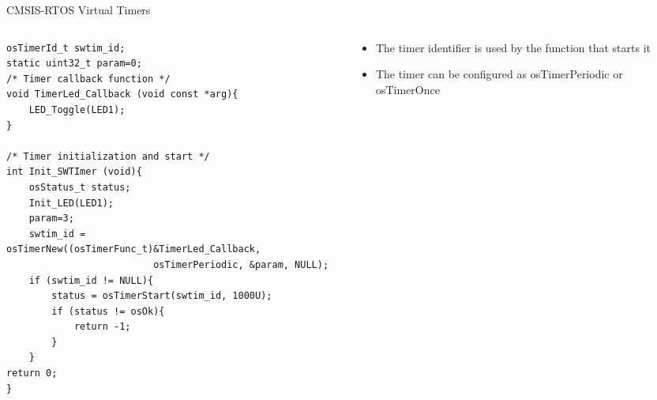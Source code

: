 \begin{frame}[fragile]{CMSIS-RTOS Virtual Timers}
    \begin{columns}
        \begin{column}{0.65\textwidth}
            \begin{verbatim}
osTimerId_t swtim_id;
static uint32_t param=0;
/* Timer callback function */
void TimerLed_Callback (void const *arg){
    LED_Toggle(LED1);
}

/* Timer initialization and start */
int Init_SWTImer (void){
    osStatus_t status;
    Init_LED(LED1);
    param=3;
    swtim_id = osTimerNew((osTimerFunc_t)&TimerLed_Callback,
                          osTimerPeriodic, &param, NULL);
    if (swtim_id != NULL){
        status = osTimerStart(swtim_id, 1000U);
        if (status != osOk){
            return -1;
        }
    }
return 0;
}

        \end{verbatim}
     \end{column}
     \begin{column}{0.35\textwidth}
         \begin{itemize}
             \item The timer identifier is used by the function that starts it
             \item The timer can be configured as osTimerPeriodic or osTimerOnce
         \end{itemize}
     \end{column}
    \end{columns}
\end{frame}

